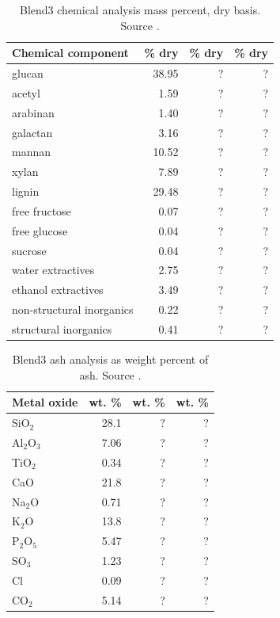 \begin{table}[H]
    \centering
    \caption{Blend3 chemical analysis mass percent, dry basis. Source \cite{Starace-2020}.}
    \label{tab:blend3-chem-analysis}
    \begin{tabular}{lrrr}
        \toprule
        Chemical component & \% dry & \% dry & \% dry \\
        \midrule
        glucan                    & 38.95 & ? & ? \\
        acetyl                    & 1.59  & ? & ? \\
        arabinan                  & 1.40  & ? & ? \\
        galactan                  & 3.16  & ? & ? \\
        mannan                    & 10.52 & ? & ? \\
        xylan                     & 7.89  & ? & ? \\
        lignin                    & 29.48 & ? & ? \\
        free fructose             & 0.07  & ? & ? \\
        free glucose              & 0.04  & ? & ? \\
        sucrose                   & 0.04  & ? & ? \\
        water extractives         & 2.75  & ? & ? \\
        ethanol extractives       & 3.49  & ? & ? \\
        non-structural inorganics & 0.22  & ? & ? \\
        structural inorganics     & 0.41  & ? & ? \\
        \bottomrule
    \end{tabular}
\end{table}

\begin{table}[H]
    \centering
    \caption{Blend3 ash analysis as weight percent of ash. Source \cite{Choratch-2017}.}
    \label{tab:blend3-ash-analysis}
    \begin{tabular}{lrrr}
        \toprule
        Metal oxide & wt. \% & wt. \% & wt. \% \\
        \midrule
        SiO$_2$     & 28.1 & ? & ? \\
        Al$_2$O$_3$ & 7.06 & ? & ? \\
        TiO$_2$     & 0.34 & ? & ? \\
        CaO         & 21.8 & ? & ? \\
        Na$_2$O     & 0.71 & ? & ? \\
        K$_2$O      & 13.8 & ? & ? \\
        P$_2$O$_5$  & 5.47 & ? & ? \\
        SO$_3$      & 1.23 & ? & ? \\
        Cl          & 0.09 & ? & ? \\
        CO$_2$      & 5.14 & ? & ? \\
        \bottomrule
    \end{tabular}
\end{table}

